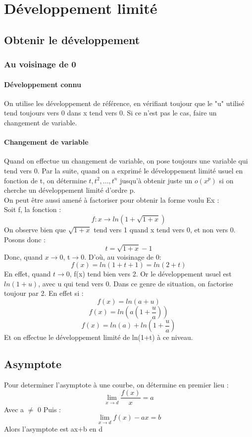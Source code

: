 
\chapter{Développement limité}
\section{Obtenir le développement}
\subsection{Au voisinage de 0}
\subsubsection{Développement connu}
On utilise les développement de référence, en vérifiant toujour que le "u" utilisé tend toujours vers 0 dans x tend vers 0. Si ce n'est pas le cas, faire un changement de variable.
\subsubsection{Changement de variable}
Quand on effectue un changement de variable, on pose toujours une variable qui tend vers 0. Par la suite, quand on a exprimé le développement limité usuel en fonction de t, on détermine $t,t^2,...,t^n$ jusqu'à obtenir juste un $o(x^p)$ si on cherche un développement limité d'ordre p.\\
On peut être aussi amené à factoriser pour obtenir la forme voulu
Ex : \\
Soit f, la fonction : 
$$f : x \rightarrow ln(1+\sqrt{1+x})$$
On observe bien que $\sqrt{1+x}$ tend vers 1 quand x tend vers 0, et non vers 0. Posons donc :
$$t = \sqrt{1+x} - 1$$
Donc, quand $x\rightarrow 0$, t$\rightarrow 0$. D'où, au voisinage de 0:
$$f(x) = ln (1 + t + 1)=ln(2+t)$$
En effet, quand $t\rightarrow 0$, f(x) tend bien vers 2.
Or le développement usuel est $ln(1+u)$, avec u qui tend vers 0. Dans ce genre de situation, on factorise toujour par 2. En effet si :
$$f(x) = ln(a+u)$$
$$f(x) = ln(a(1+\dfrac{u}{a}))$$
$$f(x) = ln(a) + ln(1+\dfrac{u}{a})$$
Et on effectue le développement limité de ln(1+t) à ce niveau.
\section{Asymptote}
Pour determiner l'asymptote à une courbe, on détermine en premier lieu :
$$\lim_{x \rightarrow d} \dfrac{f(x)}{x} = a$$
Avec a $\neq$ 0
Puis : 
$$\lim_{x \rightarrow d} f(x)-ax = b$$
Alors l'asymptote est ax+b en d